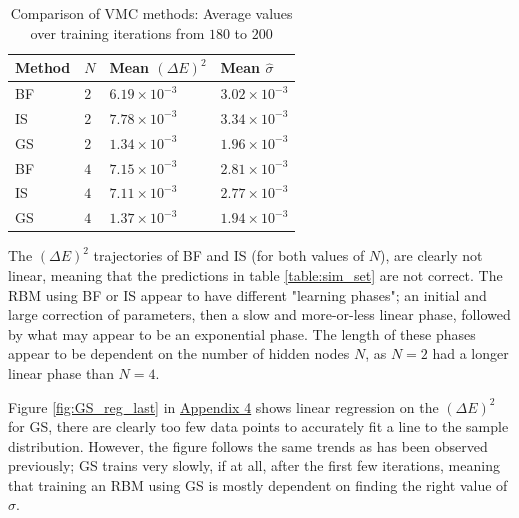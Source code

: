\documentclass[%
oneside,                 %
final,                   %
10pt]{article}
\begin{document}
\begin{table}[H]
\begin{center}
\begin{tabular}{llll}
\hline
Method & $N$ & Mean $(\Delta E)^2$ & Mean $\hat \sigma$ \\
\hline
BF &$2$ &  $ 6.19\times 10^{-3} $ & $ 3.02\times 10^{-3} $  \\
IS &$2$ &  $ 7.78\times 10^{-3} $ & $ 3.34\times 10^{-3} $  \\
GS &$2$ &  $ 1.34\times 10^{-3} $ & $1.96\times 10^{-3} $  \\
BF &$4$ &  $ 7.15\times 10^{-3} $ & $ 2.81\times 10^{-3} $  \\
IS &$4$ &  $ 7.11\times 10^{-3} $ & $ 2.77\times 10^{-3} $  \\
GS &$4$ &  $ 1.37\times 10^{-3} $ & $1.94\times 10^{-3} $  \\
\hline
\end{tabular}
\end{center}
\caption{Comparison of VMC methods: Average values over training iterations from $180$ to $200$}
\label{table:200_avr}
\end{table}

The $(\Delta E)^2$ trajectories of BF and IS (for both values of $N$), are clearly not linear, meaning that the predictions in table \ref{table:sim_set} are not correct. The RBM using BF or IS appear to have different "learning phases"; an initial and large correction of parameters, then a slow and more-or-less linear phase, followed by what may appear to be an exponential phase. The length of these phases appear to be dependent on the number of hidden nodes $N$, as $N=2$ had a longer linear phase than $N=4$. 

Figure \ref{fig:GS_reg_last} in \hyperref[APP_4]{Appendix 4} shows linear regression on the $(\Delta E)^2$ for GS, there are clearly too few data points to accurately fit a line to the sample distribution. However, the figure follows the same trends as has been observed previously; GS trains very slowly, if at all, after the first few iterations, meaning that training an RBM using GS is mostly dependent on finding the right value of $\sigma$. 
\end{document}
